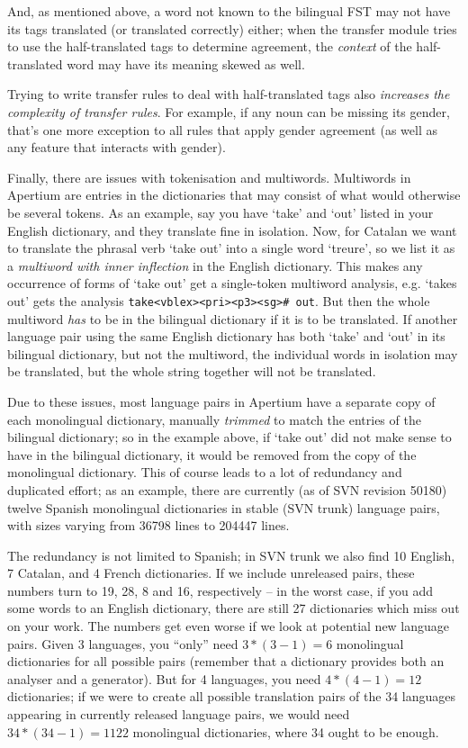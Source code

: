 \documentclass[10pt, a4paper]{article}
\newcommand{\ana}[1]{\texttt{#1}}
\newcommand{\f}[1]{`#1'}
\begin{document}
And, as mentioned above, a word not known to the bilingual FST may not
have its tags translated (or translated correctly) either; when the
transfer module tries to use the half-translated tags to determine
agreement, the \emph{context} of the half-translated word may have its
meaning skewed as well.

Trying to write transfer rules to deal with half-translated tags also
\emph{increases the complexity of transfer rules}. For example, if any
noun can be missing its gender, that's one more exception to all rules
that apply gender agreement (as well as any feature that interacts with
gender).

Finally, there are issues with tokenisation and multiwords.
Multiwords in Apertium are entries in the dictionaries that may
consist of what would otherwise be several tokens. As an example, say
you have \f{take} and \f{out} listed in your English dictionary, and
they translate fine in isolation. Now, for Catalan we want to
translate the phrasal verb \f{take out} into a single word \f{treure},
so we list it as a \emph{multiword with inner inflection} in the
English dictionary. This makes any occurrence of forms of \f{take out}
get a single-token multiword analysis, e.g. \f{takes out} gets the
analysis \ana{take<vblex><pri><p3><sg>\# out}. But then the whole multiword
\emph{has} to be in the bilingual dictionary if it is to be
translated. If another language pair using the same English dictionary
has both \f{take} and \f{out} in its bilingual dictionary, but not the
multiword, the individual words in isolation may be translated, but
the whole string together will not be translated.

Due to these issues, most language pairs in Apertium have a separate
copy of each monolingual dictionary, manually \emph{trimmed} to match
the entries of the bilingual dictionary; so in the example above, if
\f{take out} did not make sense to have in the bilingual dictionary,
it would be removed from the copy of the monolingual dictionary. This
of course leads to a lot of redundancy and duplicated effort; as an
example, there are currently (as of SVN revision 50180) twelve Spanish
monolingual dictionaries in stable (SVN trunk) language pairs, with
sizes varying from 36798 lines to 204447 lines.

The redundancy is not limited to Spanish; in SVN trunk we also find 10
English, 7 Catalan, and 4 French dictionaries. If we include
unreleased pairs, these numbers turn to 19, 28, 8 and 16, respectively
-- in the worst case, if you add some words to an English dictionary,
there are still 27 dictionaries which miss out on your work.  The
numbers get even worse if we look at potential new language pairs.
Given 3 languages, you ``only'' need $3*(3-1)=6$ monolingual
dictionaries for all possible pairs (remember that a dictionary
provides both an analyser and a generator). But for 4 languages, you
need $4*(4-1)=12$ dictionaries; if we were to  create all possible
translation pairs of the 34 languages appearing in currently released
language pairs, we would need $34*(34-1)=1122$ monolingual dictionaries,
where 34 ought to be enough.
\end{document}
